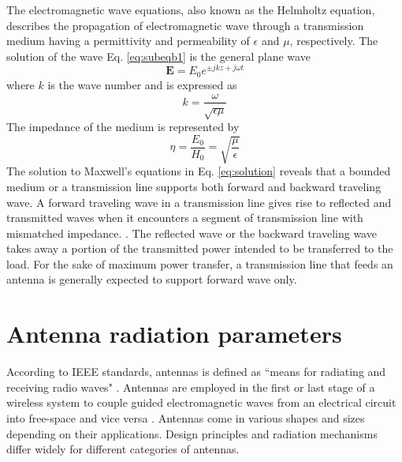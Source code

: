 %
The electromagnetic wave equations, also known as the Helmholtz equation, describes the propagation of electromagnetic wave through a transmission medium having a permittivity and permeability of $\epsilon$ and $\mu$, respectively. The solution of the wave Eq. \ref{eq:subeqb1} is the general plane wave 
%
\begin{equation} \label{eq:solution}
    \mathbf{E} = E_0 e^{\pm jkz + j\omega t}
\end{equation}
%
where $k$ is the wave number and is expressed as
\begin{equation}
 k = \dfrac{\omega}{\sqrt{\epsilon \mu}} 
 \end{equation}
% 
The impedance of the medium is represented by
%
\begin{equation} \label{eq:eta}
    \eta = \dfrac{E_0}{H_0} = \sqrt{\dfrac{\mu}{\epsilon}}
\end{equation}
%
The solution to Maxwell's equations in Eq. \ref{eq:solution} reveals that a bounded medium or a transmission line supports both forward and backward traveling wave. A forward traveling wave in a transmission line gives rise to reflected and transmitted waves when it encounters a segment of transmission line with mismatched impedance. \cite{sadiku2001}. The reflected wave or the backward traveling wave takes away a portion of the transmitted power intended to be transferred to the load. For the sake of maximum power transfer, a transmission line that feeds an antenna is generally expected to support forward wave only. 

\section{Antenna radiation parameters}

According to IEEE standards, antennas is defined as ``means for radiating and receiving radio waves" \cite{IEEE1983}. Antennas are employed in the first or last stage of a wireless system to couple guided electromagnetic waves from an electrical circuit into free-space and vice versa \cite{Stutzman2012, Balanis2005, Kraus2002}. Antennas come in various shapes and sizes depending on their applications. Design principles and radiation mechanisms differ widely for different categories of antennas.

